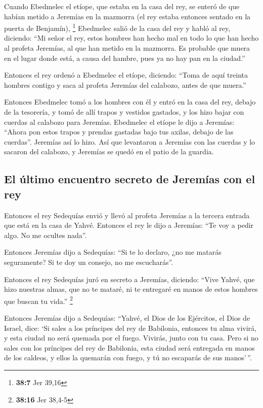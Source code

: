  Cuando Ebedmelec el etíope, que estaba en la casa del
rey, se enteró de que habían metido a Jeremías en la mazmorra (el rey
estaba entonces sentado en la puerta de Benjamín), \footnote{\textbf{38:7}
  Jer 39,16}  Ebedmelec salió de la casa del rey y habló
al rey, diciendo:  ``Mi señor el rey, estos hombres han
hecho mal en todo lo que han hecho al profeta Jeremías, al que han
metido en la mazmorra. Es probable que muera en el lugar donde está, a
causa del hambre, pues ya no hay pan en la ciudad.''

 Entonces el rey ordenó a Ebedmelec el etíope, diciendo:
``Toma de aquí treinta hombres contigo y saca al profeta Jeremías del
calabozo, antes de que muera.''

 Entonces Ebedmelec tomó a los hombres con él y entró en
la casa del rey, debajo de la tesorería, y tomó de allí trapos y
vestidos gastados, y los hizo bajar con cuerdas al calabozo para
Jeremías.  Ebedmelec el etíope le dijo a Jeremías:
``Ahora pon estos trapos y prendas gastadas bajo tus axilas, debajo de
las cuerdas''. Jeremías así lo hizo.  Así que levantaron
a Jeremías con las cuerdas y lo sacaron del calabozo, y Jeremías se
quedó en el patio de la guardia.

\hypertarget{el-uxfaltimo-encuentro-secreto-de-jeremuxedas-con-el-rey}{%
\subsection{El último encuentro secreto de Jeremías con el
rey}\label{el-uxfaltimo-encuentro-secreto-de-jeremuxedas-con-el-rey}}

 Entonces el rey Sedequías envió y llevó al profeta
Jeremías a la tercera entrada que está en la casa de Yahvé. Entonces el
rey le dijo a Jeremías: ``Te voy a pedir algo. No me ocultes nada''.

 Entonces Jeremías dijo a Sedequías: ``Si te lo declaro,
¿no me matarás seguramente? Si te doy un consejo, no me escucharás''.

 Entonces el rey Sedequías juró en secreto a Jeremías,
diciendo: ``Vive Yahvé, que hizo nuestras almas, que no te mataré, ni te
entregaré en manos de estos hombres que buscan tu vida.'' \footnote{\textbf{38:16}
  Jer 38,4-5}

 Entonces Jeremías dijo a Sedequías: ``Yahvé, el Dios de
los Ejércitos, el Dios de Israel, dice: `Si sales a los príncipes del
rey de Babilonia, entonces tu alma vivirá, y esta ciudad no será quemada
por el fuego. Vivirás, junto con tu casa.  Pero si no
sales con los príncipes del rey de Babilonia, esta ciudad será entregada
en manos de los caldeos, y ellos la quemarán con fuego, y tú no
escaparás de sus manos'\,''.

